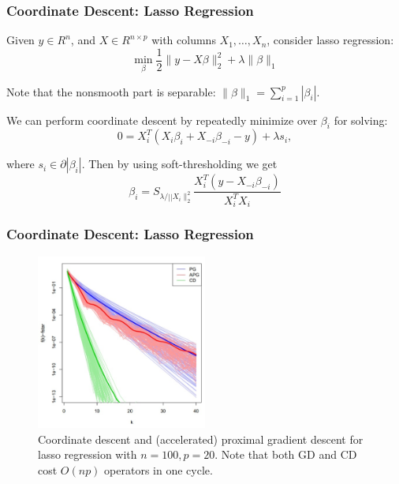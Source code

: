 \begin{frame}
\frametitle{Coordinate Descent: Lasso Regression}
Given $y \in R^n$, and $X \in R^{n \times p}$ with columns $X_1, \ldots, X_n$, consider lasso regression:
$$
\min_\beta \frac{1}{2}\|y-X \beta\|_2^2+\lambda\|\beta\|_1
$$

Note that the nonsmooth part is separable: $\|\beta\|_1=\sum_{i=1}^p\left|\beta_i\right|$.

We can perform coordinate descent by repeatedly minimize over $\beta_i$ for solving:
\begin{equation}
    0=X_i^T\left(X_i \beta_i+X_{-i} \beta_{-i}-y\right)+\lambda s_i,
\end{equation}

where $s_i \in \partial\left|\beta_i\right|$. Then by using soft-thresholding we get
$$
\beta_i=S_{\lambda /|| X_i \|_2^2} \frac{X_i^T\left(y-X_{-i} \beta_{-i}\right)}{X_i^T X_i}
$$
\end{frame}

\begin{frame}
    \frametitle{Coordinate Descent: Lasso Regression}
\begin{figure}[!htbp]
    \begin{center}
        \includegraphics[width=0.5\textwidth]{img/cd_lasso.png}
    \end{center}
    \caption{Coordinate descent and (accelerated) proximal gradient descent for lasso regression with $n=100,p=20$. Note that both GD and CD cost $O(np)$ operators in one cycle.}\label{fig:cd_lasso}
\end{figure}
\end{frame}

